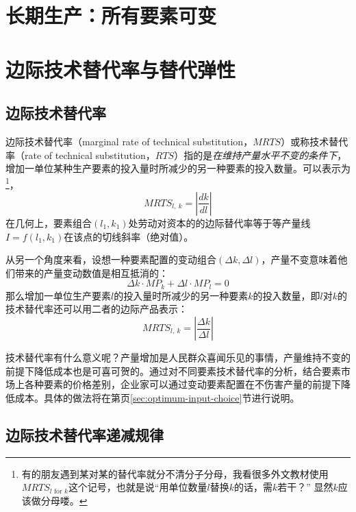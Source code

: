 \section[长期生产]{长期生产：所有要素可变}



\section{边际技术替代率与替代弹性}

\subsection{边际技术替代率}

边际技术替代率（marginal rate of technical substitution，$MRTS$）或称技术替代率（rate of technical substitution，$RTS$）指的是\emph{在维持产量水平不变的条件下}，增加一单位某种生产要素的投入量时所减少的另一种要素的投入数量。可以表示为\footnote{%
有的朋友遇到某对某的替代率就分不清分子分母，我看很多外文教材使用$MRTS_{l \text{ for } k}$这个记号，也就是说“用单位数量$l$替换$k$的话，需$k$若干？” 显然$k$应该做分母喽。}，
\begin{equation}
MRTS_{l,~k} = \left| {\frac{{dk}}{{dl}}} \right|
\label{eq:rts}
\end{equation}
在几何上，要素组合$(l_1,k_1)$处劳动对资本的的边际替代率等于等产量线$I=f(l_1,k_1)$在该点的切线斜率（绝对值）。

从另一个角度来看，设想一种要素配置的变动组合$(\Delta k, \Delta l)$，产量不变意味着他们带来的产量变动数值是相互抵消的：
\[
\Delta k \cdot MP_k + \Delta l \cdot MP_l = 0
\]
那么增加一单位生产要素$l$的投入量时所减少的另一种要素$k$的投入数量，即$l$对$k$的技术替代率还可以用二者的边际产品表示：
\begin{equation}
MRTS_{l,~k} = \left|\frac{\Delta k}{\Delta l} \right| %
\label{eq:rts-in-mp-fraction}
\end{equation}

技术替代率有什么意义呢？产量增加是人民群众喜闻乐见的事情，产量维持不变的前提下降低成本也是可喜可贺的。通过对不同要素技术替代率的分析，结合要素市场上各种要素的价格差别，企业家可以通过变动要素配置在不伤害产量的前提下降低成本。具体的做法将在第\pageref{sec:optimum-input-choice}页\ref{sec:optimum-input-choice}节进行说明。

\subsection{边际技术替代率递减规律}

